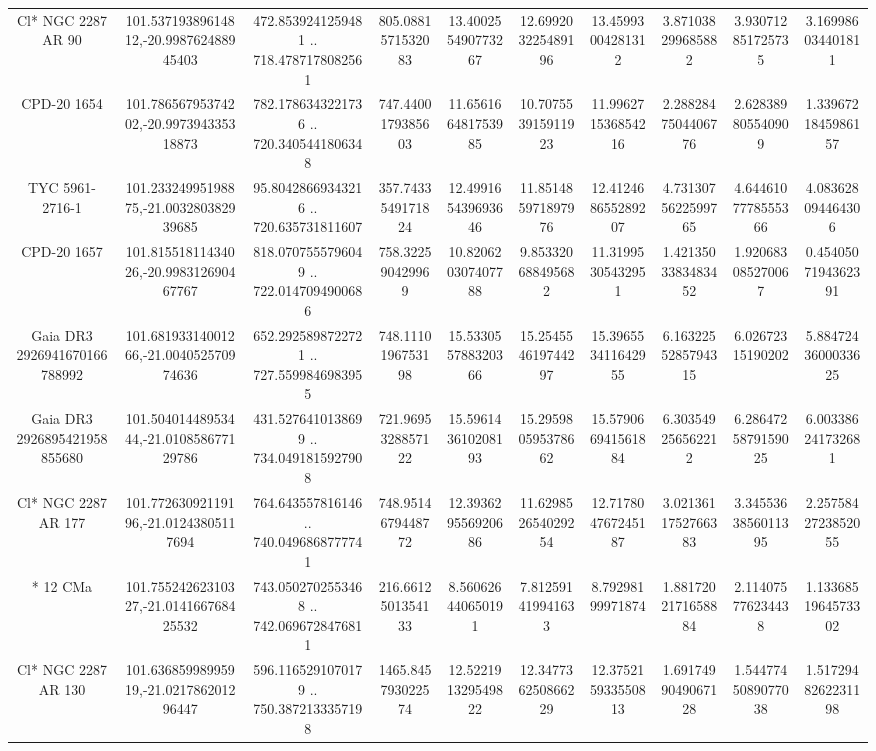 \begin{table}
\begin{tabular}{cccccccccc}
Cl* NGC 2287     AR      90 & 101.53719389614812,-20.998762488945403 & 472.8539241259481 .. 718.4787178082561 & 805.0881571532083 & 13.400255490773267 & 12.699203225489196 & 13.45993004281312 & 3.871038299685882 & 3.930712851725735 & 3.169986034401811 \\
CPD-20  1654 & 101.78656795374202,-20.997394335318873 & 782.1786343221736 .. 720.3405441806348 & 747.4400179385603 & 11.656166481753985 & 10.707553915911923 & 11.996271536854216 & 2.2882847504406776 & 2.628389805540909 & 1.3396721845986157 \\
TYC 5961-2716-1 & 101.23324995198875,-21.003280382939685 & 95.80428669343216 .. 720.635731811607 & 357.7433549171824 & 12.499165439693646 & 11.851485971897976 & 12.412468655289207 & 4.7313075622599765 & 4.6446107778555366 & 4.083628094464306 \\
CPD-20  1657 & 101.81551811434026,-20.998312690467767 & 818.0707555796049 .. 722.0147094900686 & 758.322590429969 & 10.820620307407788 & 9.853320688495682 & 11.31995305432951 & 1.4213503383483452 & 1.920683085270067 & 0.4540507194362391 \\
Gaia DR3 2926941670166788992 & 101.68193314001266,-21.004052570974636 & 652.2925898722721 .. 727.5599846983955 & 748.1110196753198 & 15.533055788320366 & 15.254554619744297 & 15.396553411642955 & 6.1632255285794315 & 6.02672315190202 & 5.8847243600033625 \\
Gaia DR3 2926895421958855680 & 101.50401448953444,-21.010858677129786 & 431.5276410138699 .. 734.0491815927908 & 721.9695328857122 & 15.596143610208193 & 15.295980595378662 & 15.579066941561884 & 6.303549256562212 & 6.2864725879159025 & 6.003386241732681 \\
Cl* NGC 2287     AR     177 & 101.77263092119196,-21.01243805117694 & 764.643557816146 .. 740.0496868777741 & 748.9514679448772 & 12.393629556920686 & 11.629852654029254 & 12.717804767245187 & 3.0213611752766383 & 3.3455363856011395 & 2.2575842723852055 \\
*  12 CMa & 101.75524262310327,-21.014166768425532 & 743.0502702553468 .. 742.0696728476811 & 216.6612501354133 & 8.560626440650191 & 7.812591419941633 & 8.79298199971874 & 1.8817202171658884 & 2.114075776234438 & 1.1336851964573302 \\
Cl* NGC 2287     AR     130 & 101.63685998995919,-21.021786201296447 & 596.1165291070179 .. 750.3872133357198 & 1465.845793022574 & 12.522191329549822 & 12.347736250866229 & 12.375215933550813 & 1.6917499049067128 & 1.5447745089077038 & 1.5172948262231198 \\

\end{tabular}
\end{table}
